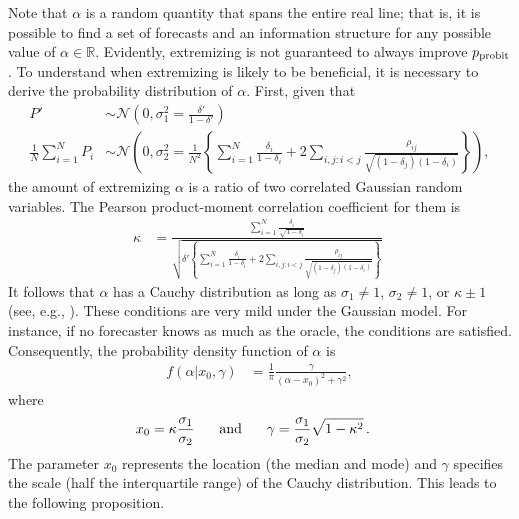 \documentclass[11pt]{article}
\theoremstyle{definition}
\theoremstyle{definition}
\def\probit{p_{\rm probit}}
\begin{document}
Note that $\alpha$ is a random quantity that spans the entire real line;
that is, it is possible to find a set of forecasts and an information structure for any possible value of $\alpha \in
\mathbb{R}$.  Evidently, extremizing is not guaranteed to always
improve $\probit$.  To understand when extremizing is
likely to be beneficial, it is necessary to derive the probability
distribution of $\alpha$.  First, given that
\begin{align*}
P' &\sim \mathcal{N}\left(0, \sigma^2_{1} = 
  \frac{\delta'}{1-\delta'} \right)\\ \frac{1}{N}\sum_{i=1}^N P_{i} 
&\sim \mathcal{N}\left(0, \sigma^2_{2} =\frac{1}{N^2} 
  \left\{ \sum_{i=1}^N \frac{\delta_i}{1-\delta_i} 
  + 2 \sum_{i,j: i<j} \frac{\rho_{ij}}{\sqrt{(1-\delta_j)(1-\delta_i)}}
  \right\} \right),
\end{align*}
the amount of extremizing $\alpha$ is a ratio of two correlated
Gaussian random variables.  The Pearson product-moment correlation
coefficient for them is
\begin{align*}
\kappa  &= 
  \frac{ \sum_{i=1}^N \frac{\delta_i}{\sqrt{1-\delta_i}}}
  {\sqrt{\delta'  \left\{ \sum_{i=1}^N \frac{\delta_i}{1-\delta_i} + 2 
  \sum_{i,j: i<j} \frac{\rho_{ij}}{\sqrt{(1-\delta_j)(1-\delta_i)}}\right\}}}
  \; 
\end{align*}
It follows that $\alpha$ has a Cauchy distribution as long as
$\sigma_1 \neq 1$, $\sigma_2 \neq 1$, or $\kappa \pm 1$ (see, e.g.,
\citealt{cedilnik2004distribution}).  These
conditions are very mild under the Gaussian model.
For instance, if no forecaster knows as much as the oracle, the
conditions are satisfied.  Consequently, the probability density
function of $\alpha$ is
\begin{align*}
f(\alpha | x_0, \gamma) &= \frac{1}{\pi} 
  \frac{\gamma}{(\alpha-x_0)^2+\gamma^2}, 
\end{align*}
where 
\begin{align*}
x_0 = \kappa \frac{\sigma_1}{\sigma_2} \hspace{0.2in} \mbox{ and } 
  \hspace{0.2in} \gamma &= \frac{\sigma_1}{\sigma_2} \sqrt{1-\kappa^2} \, .
\end{align*}
The parameter $x_0$ represents the location (the median and mode) and
$\gamma$ specifies the scale (half the interquartile range) of the
Cauchy distribution. This leads to the following proposition.  
\end{document}
